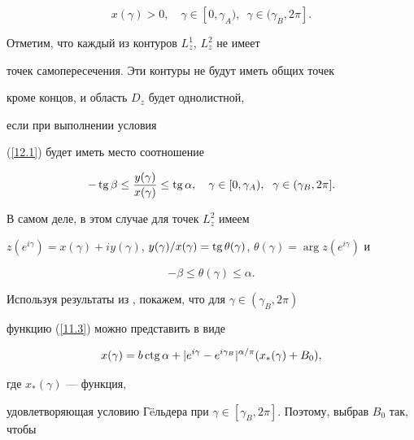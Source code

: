 {\begin{equation}\label{12.1}


x(\gamma) > 0,\quad\gamma\in [0,\gamma_{A}),\ \;\gamma\in (\gamma_{B},


2\pi].


\end{equation}


 


Отметим, что каждый из контуров $L_{z}^{1}$, $L_{z}^{2}$ не имеет


точек самопересечения. Эти контуры не будут иметь общих точек


кроме концов, и область $D_{z}$ будет однолистной,


если при выполнении условия


(\ref{12.1}) будет иметь место соотношение


\begin{equation}\label{12.2}


-\tg\beta\leq\frac{y(\gamma)}{x(\gamma)}\leq\tg\alpha,


\quad\gamma\in [0,\gamma_{A}),\ \;\gamma\in (\gamma_{B},2\pi].


\end{equation}


В самом деле, в этом случае для точек $L_{z}^{2}$ имеем


$z(e^{i\gamma})=x(\gamma)+iy(\gamma)$, $y(\gamma)/x(\gamma)=


\tg\theta(\gamma)$, $\theta(\gamma)=\arg z(e^{i\gamma})$ и


$$


-\beta\leq\theta(\gamma)\leq\alpha.


$$





Используя результаты из \cite{Sa}, покажем, что для $\gamma\in


(\gamma_{B},2\pi)$


функцию (\ref{11.3}) можно представить в виде


$$


x(\gamma)=b\ctg \alpha +|e^{i\gamma}-e^{i\gamma_{B}}|^{\alpha/\pi}


(x_{*}(\gamma)+B_{0}),


$$


где $x_{*}(\gamma)$ --- функция, 


удовлетворяющая условию Г\"eльдера при $\gamma\in 


[\gamma_{B},2\pi]$. Поэтому, выбрав $B_{0}$ так, чтобы


}
